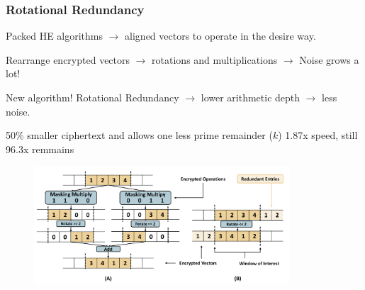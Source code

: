 \documentclass[10pt,handout]{beamer}
\begin{document}


\begin{frame}
\frametitle{Rotational Redundancy}

Packed HE algorithms $\rightarrow$  aligned vectors to operate in the desire way.

    Rearrange encrypted vectors $\rightarrow$ rotations and multiplications  $\rightarrow$ Noise grows a lot!

New algorithm! Rotational Redundancy $\rightarrow$ lower arithmetic depth $\rightarrow$ less noise.

50\% smaller ciphertext and allows one less prime remainder ($k$)  1.87x speed, still 96.3x remmains
\begin{figure}
    \includegraphics[width=0.85\textwidth]{rotation.png}
\end{figure}



\end{frame}



%
%
%
%
%
%
%
%
\end{document}
